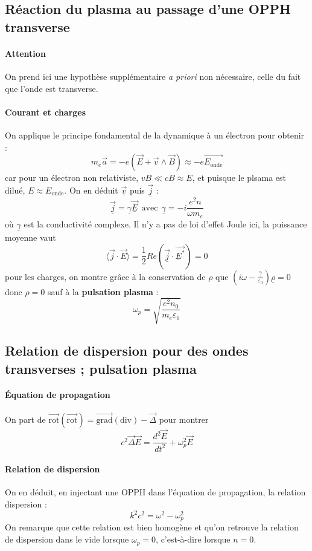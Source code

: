 \documentclass[french]{book}
\theoremstyle{plain}
\theoremstyle{definition}
\theoremstyle{remark}
\newcommand{\st}{^*}
\newcommand{\grad}{\overrightarrow{\text{grad}}}
\newcommand{\rot}{\overrightarrow{\text{rot}}}
\renewcommand{\div}{\text{div}}
\begin{document}
\subsection{Réaction du plasma au passage d'une OPPH transverse}
\paragraph{Attention} On prend ici une hypothèse supplémentaire \textit{a priori} non nécessaire, celle du fait que l'onde est transverse.
\paragraph{Courant et charges} On applique le principe fondamental de la dynamique à un électron pour obtenir : $$m_e\overrightarrow{a}=-e\left(\overrightarrow{E}+\overrightarrow{v}\wedge\overrightarrow{B}\right)\approx-e\overrightarrow{E_\text{onde}}$$ car pour un électron non relativiste, $vB\ll cB\approx E$, et puisque le plsama est dilué, $E\approx E_\text{onde}$. On en déduit $\overrightarrow{\underline{v}}$ puis $\overrightarrow{\underline{j}}$ : $$\overrightarrow{\underline{j}}=\underline{\gamma}\overrightarrow{\underline{E}} \ \ \text{avec} \ \ \underline{\gamma}=-i\frac{e^2n}{\omega m_e}$$ où $\underline{\gamma}$ est la conductivité complexe. Il n'y a pas de loi d'effet Joule ici, la puissance moyenne vaut $$\langle \overrightarrow{j}\cdot\overrightarrow{E}\rangle=\frac12Re\left(\overrightarrow{\underline{j}}\cdot\overrightarrow{\underline{E}\st}\right)=0$$ pour les charges, on montre grâce à la conservation de $\rho$ que $\displaystyle \left(i\omega-\frac{\underline{\gamma}}{\varepsilon_0}\right)\underline{\rho}=0$ donc $\rho=0$ sauf à la \textbf{pulsation plasma} : $$\omega_p=\sqrt{\frac{e^2n_0}{m_e\varepsilon_0}}$$
\subsection{Relation de dispersion pour des ondes transverses ; pulsation plasma}
\paragraph{Équation de propagation} On part de $\rot(\rot)=\grad(\div)-\overrightarrow{\Delta}$ pour montrer $$c^2\overrightarrow{\Delta}\overrightarrow{E}=\frac{d^2\overrightarrow{E}}{dt^2}+\omega_p^2\overrightarrow{E}$$ 
\paragraph{Relation de dispersion}On en déduit, en injectant une OPPH dans l'équation de propagation, la relation dispersion : $$k^2c^2=\omega^2-\omega_p^2$$ On remarque que cette relation est bien homogène et qu'on retrouve la relation de dispersion dans le vide lorsque $\omega_p=0$, c'est-à-dire lorsque $n=0$.
\end{document}

